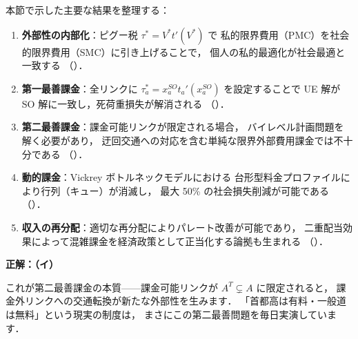 本節で示した主要な結果を整理する：
\begin{enumerate}
  \item \textbf{外部性の内部化}：ピグー税 $\tau^* = V^* t'(V^*)$ で
        私的限界費用（PMC）を社会的限界費用（SMC）に引き上げることで，
        個人の私的最適化が社会最適と一致する
        （）．
  \item \textbf{第一最善課金}：全リンクに $\tau_a^* = x_a^{SO} t_a'(x_a^{SO})$
        を設定することで UE 解が SO 解に一致し，死荷重損失が解消される
        （）．
  \item \textbf{第二最善課金}：課金可能リンクが限定される場合，
        バイレベル計画問題を解く必要があり，
        迂回交通への対応を含む単純な限界外部費用課金では不十分である
        （）．
  \item \textbf{動的課金}：Vickrey ボトルネックモデルにおける
        台形型料金プロファイルにより行列（キュー）が消滅し，
        最大 50\% の社会損失削減が可能である
        （）．
  \item \textbf{収入の再分配}：適切な再分配によりパレート改善が可能であり，
        二重配当効果によって混雑課金を経済政策として正当化する論拠も生まれる
        （）．
\end{enumerate}

\begin{example}[title={クイズ 10 正解・解説}]
\label{ans:q10}
\textbf{正解：（イ）}

これが第二最善課金の本質——課金可能リンクが $A^T\subsetneq A$ に限定されると，
課金外リンクへの交通転換が新たな外部性を生みます．
「首都高は有料・一般道は無料」という現実の制度は，
まさにこの第二最善問題を毎日実演しています．
\end{example}
